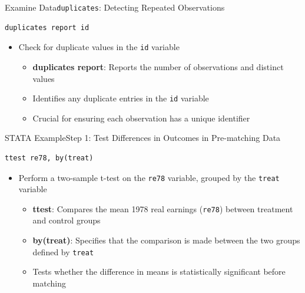 \documentclass[dvipsnames,hyperref={pdfpagelabels=false}]{beamer}
\begin{document}
\begin{frame}[fragile]{Examine Data}{\texttt{duplicates}: Detecting Repeated Observations}
\begin{lstlisting}
duplicates report id
\end{lstlisting}
\begin{itemize}
	\vspace{0.2cm}
	\item Check for duplicate values in the \texttt{id} variable
	\vspace{0.2cm}
	\begin{itemize}
		\item \textbf{duplicates report}: Reports the number of observations and distinct values
		\vspace{0.2cm}
		\item Identifies any duplicate entries in the \texttt{id} variable
		\vspace{0.2cm}
		\item Crucial for ensuring each observation has a unique identifier
	\end{itemize}
\end{itemize}
\end{frame}


\begin{frame}[fragile]{STATA Example}{Step 1: Test Differences in Outcomes in Pre-matching Data}
\begin{lstlisting}
ttest re78, by(treat)
\end{lstlisting}
\begin{itemize}
	\vspace{0.2cm}
	\item Perform a two-sample t-test on the \texttt{re78} variable, grouped by the \texttt{treat} variable
	\vspace{0.2cm}
	\begin{itemize}
		\item \textbf{ttest}: Compares the mean 1978 real earnings (\texttt{re78}) between treatment and control groups
		\vspace{0.2cm}
		\item \textbf{by(treat)}: Specifies that the comparison is made between the two groups defined by \texttt{treat}
		\vspace{0.2cm}
		\item Tests whether the difference in means is statistically significant before matching
	\end{itemize}
\end{itemize}
\end{frame}
\end{document}
